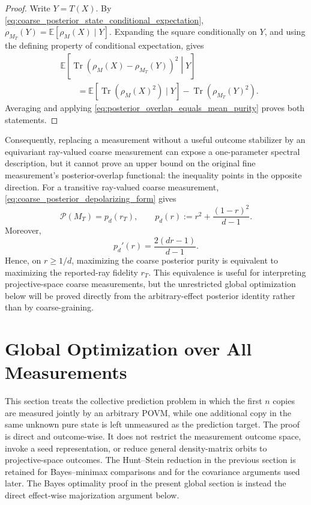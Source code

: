 \documentclass[journal]{IEEEtran}
\begin{document}
\begin{proof}
Write \(Y=T(X)\).  By
\eqref{eq:coarse_posterior_state_conditional_expectation},
\(
 \rho_{M_T}(Y)=\mathbb E[\rho_M(X)\mid Y]
\).
Expanding the square conditionally on \(Y\), and using the defining property of
conditional expectation, gives
\[
\begin{aligned}
&\mathbb E\!\left[
 \operatorname{Tr}
 \left(
   \rho_M(X)-\rho_{M_T}(Y)
 \right)^2
 \middle|Y
\right]\\
&\qquad=
\mathbb E[\operatorname{Tr}(\rho_M(X)^2)\mid Y]
-\operatorname{Tr}(\rho_{M_T}(Y)^2).
\end{aligned}
\]
Averaging and applying
\eqref{eq:posterior_overlap_equals_mean_purity} proves both statements.
\end{proof}

Consequently, replacing a measurement without a useful outcome stabilizer by
an equivariant ray-valued coarse measurement can expose a one-parameter
spectral description, but it cannot prove an upper bound on the original fine
measurement's posterior-overlap functional: the inequality points in the
opposite direction.  For a transitive ray-valued coarse measurement,
\eqref{eq:coarse_posterior_depolarizing_form} gives
\begin{equation}
    \mathcal P(M_T)
    =
    p_d(r_T),
    \qquad
    p_d(r):=r^2+\frac{(1-r)^2}{d-1}.
    \label{eq:coarse_posterior_overlap_as_fidelity_function}
\end{equation}
Moreover,
\begin{equation}
    p_d'(r)=\frac{2(dr-1)}{d-1}.
    \label{eq:coarse_purity_fidelity_monotonicity_derivative}
\end{equation}
Hence, on \(r\ge1/d\), maximizing the coarse posterior purity is equivalent to
maximizing the reported-ray fidelity \(r_T\).  This equivalence is useful for
interpreting projective-space coarse measurements, but the unrestricted global
optimization below will be proved directly from the arbitrary-effect posterior
identity rather than by coarse-graining.

\section{Global Optimization over All Measurements}  

\label{sec:global_optimization}

This section treats the collective prediction problem in which the first
\(n\) copies are measured jointly by an arbitrary POVM, while one additional
copy in the same unknown pure state is left unmeasured as the prediction target.
The proof is direct and outcome-wise.  It does not restrict the measurement
outcome space, invoke a seed representation, or reduce general density-matrix
orbits to projective-space outcomes.
The Hunt--Stein reduction in the previous section is retained for
Bayes--minimax comparisons and for the covariance arguments used later.
The Bayes optimality proof in the present global section is instead the
direct effect-wise majorization argument below.
\end{document}
